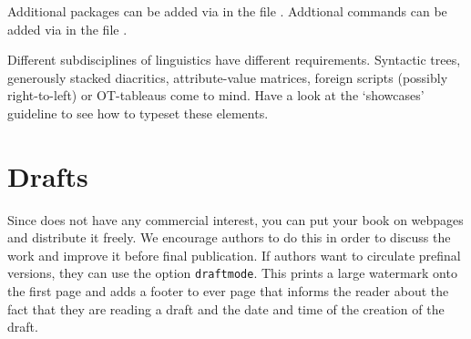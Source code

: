 Additional packages can be added via  in the file .
Addtional commands can be added via  in the file . 


Different subdisciplines of linguistics have different requirements. Syntactic trees, generously stacked diacritics, attribute-value matrices, foreign scripts (possibly right-to-left) or OT-tableaus come to mind. Have a look at the `showcases' guideline to see how to typeset these elements.


 
   
\section{Drafts}

Since \lsp does not have any commercial interest, you can put your book on webpages and distribute it
freely. We encourage authors to do this in order to discuss the work and improve it before final
publication. If authors want to circulate prefinal versions, they can use the option
\texttt{draftmode}. This prints a large watermark onto the first page and adds a footer to ever page
that informs the reader about the fact that they are reading a draft and the date and time of the
creation of the draft.
  